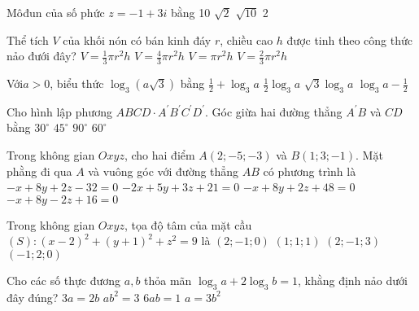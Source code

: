 \begin{ex} %
Môđun của số phức $z=-1+3 i$ bằng
\choice
{10}
{$\sqrt{2}$}
{\True $\sqrt{10}$}
{2}
\end{ex}

\begin{ex} %
Thể tích $V$ của khối nón có bán kinh đáy $r$, chiều cao $ h$ được tinh theo công thức nảo đưới đây?
\choice
{\True $V=\frac{1}{3} \pi r^{2} h$}
{$V=\frac{4}{3} \pi r^{2} h$}
{$V=\pi r^{2} h$}
{$V=\frac{2}{3} \pi r^{2} h$}
\end{ex}

\begin{ex} %
Với$a>0$, biểu thức $\log _{3}(a \sqrt{3})$ bằng
\choice
{\True $\frac{1}{2}+\log _{3} a$}
{$\frac{1}{2} \log _{3} a$}
{$\sqrt{3} \log _{3} a$}
{$\log _{3} a-\frac{1}{2}$}
\end{ex}

\begin{ex} %
Cho hình lập phương $A B C D \cdot A^{\prime} B^{\prime} C^{\prime} D^{\prime}$. Góc giừa hai đường thẳng $A^{\prime} B$ và $C D$ bằng
\choice
{$30^{\circ}$}
{\True $45^{\circ}$}
{$90^{\circ}$}
{$60^{\circ}$}
\end{ex}

\begin{ex} %
Trong không gian $Oxyz$, cho hai điểm $A(2 ;-5 ;-3)$ và $B(1 ; 3 ;-1)$. Mặt phằng đi qua $A$ và vuông góc với đường thẳng $A B$ có phương trình là
\choice
{$-x+8 y+2 z-32=0$}
{$-2 x+5 y+3 z+21=0 $}
{\True $-x+8 y+2 z+48=0$}
{$-x+8 y-2 z+16=0$}
\end{ex}

\begin{ex} %
Trong không gian $Oxyz$, tọa độ tâm của mặt cầu $(S):(x-2)^{2}+(y+1)^{2}+z^{2}=9$ là
\choice
{\True $(2 ;-1 ; 0)$}
{$(1 ; 1 ; 1)$}
{$(2 ;-1 ; 3)$}
{$(-1 ; 2 ; 0)$}
\end{ex}

\begin{ex} %
Cho các số thực đương $a, b$ thỏa mãn $\log _{3} a+2 \log _{3} b=1$, khằng định nảo dưới đây đúng?
\choice
{$3 a=2 b$}
{\True $a b^{2}=3$}
{$6 a b=1$}
{$a=3 b^{2}$}
\end{ex}


